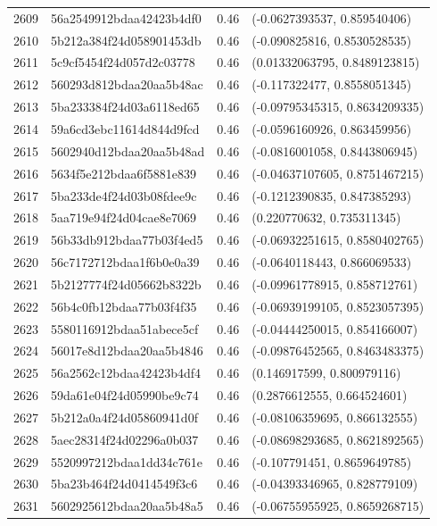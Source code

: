 \begin{table}[ht]
\begin{tabular}{rlrl}
  2609 & 56a2549912bdaa42423b4df0 & 0.46 & (-0.0627393537, 0.859540406) \\ 
  2610 & 5b212a384f24d058901453db & 0.46 & (-0.090825816, 0.8530528535) \\ 
  2611 & 5c9cf5454f24d057d2c03778 & 0.46 & (0.01332063795, 0.8489123815) \\ 
  2612 & 560293d812bdaa20aa5b48ac & 0.46 & (-0.117322477, 0.8558051345) \\ 
  2613 & 5ba233384f24d03a6118ed65 & 0.46 & (-0.09795345315, 0.8634209335) \\ 
  2614 & 59a6cd3ebc11614d844d9fcd & 0.46 & (-0.0596160926, 0.863459956) \\ 
  2615 & 5602940d12bdaa20aa5b48ad & 0.46 & (-0.0816001058, 0.8443806945) \\ 
  2616 & 5634f5e212bdaa6f5881e839 & 0.46 & (-0.04637107605, 0.8751467215) \\ 
  2617 & 5ba233de4f24d03b08fdee9c & 0.46 & (-0.1212390835, 0.847385293) \\ 
  2618 & 5aa719e94f24d04cae8e7069 & 0.46 & (0.220770632, 0.735311345) \\ 
  2619 & 56b33db912bdaa77b03f4ed5 & 0.46 & (-0.06932251615, 0.8580402765) \\ 
  2620 & 56c7172712bdaa1f6b0e0a39 & 0.46 & (-0.0640118443, 0.866069533) \\ 
  2621 & 5b2127774f24d05662b8322b & 0.46 & (-0.09961778915, 0.858712761) \\ 
  2622 & 56b4c0fb12bdaa77b03f4f35 & 0.46 & (-0.06939199105, 0.8523057395) \\ 
  2623 & 5580116912bdaa51abece5cf & 0.46 & (-0.04444250015, 0.854166007) \\ 
  2624 & 56017e8d12bdaa20aa5b4846 & 0.46 & (-0.09876452565, 0.8463483375) \\ 
  2625 & 56a2562c12bdaa42423b4df4 & 0.46 & (0.146917599, 0.800979116) \\ 
  2626 & 59da61e04f24d05990be9c74 & 0.46 & (0.2876612555, 0.664524601) \\ 
  2627 & 5b212a0a4f24d05860941d0f & 0.46 & (-0.08106359695, 0.866132555) \\ 
  2628 & 5aec28314f24d02296a0b037 & 0.46 & (-0.08698293685, 0.8621892565) \\ 
  2629 & 5520997212bdaa1dd34c761e & 0.46 & (-0.107791451, 0.8659649785) \\ 
  2630 & 5ba23b464f24d0414549f3c6 & 0.46 & (-0.04393346965, 0.828779109) \\ 
  2631 & 5602925612bdaa20aa5b48a5 & 0.46 & (-0.06755955925, 0.8659268715) \\ 

\end{tabular}
\end{table}
